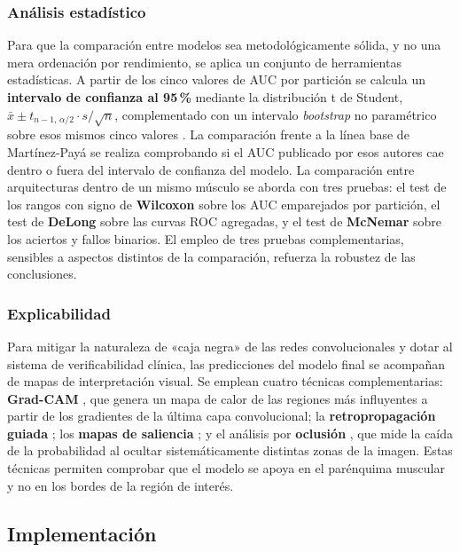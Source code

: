 \documentclass[12pt]{extarticle}
\numberwithin{equation}{section}
\begin{document}
\begin{refsection}
\subsubsection{Análisis estadístico}

Para que la comparación entre modelos sea metodológicamente sólida, y no una mera ordenación por rendimiento, se aplica un conjunto de herramientas estadísticas. A partir de los cinco valores de AUC por partición se calcula un \textbf{intervalo de confianza al 95\,\%} mediante la distribución t de Student, $\bar{x} \pm t_{n-1,\,\alpha/2}\cdot s/\sqrt{n}$, complementado con un intervalo \textit{bootstrap} no paramétrico sobre esos mismos cinco valores \cite{efron1979bootstrap}. La comparación frente a la línea base de Martínez-Payá se realiza comprobando si el AUC publicado por esos autores cae dentro o fuera del intervalo de confianza del modelo. La comparación entre arquitecturas dentro de un mismo músculo se aborda con tres pruebas: el test de los rangos con signo de \textbf{Wilcoxon} \cite{wilcoxon1945individual} sobre los AUC emparejados por partición, el test de \textbf{DeLong} \cite{delong1988comparing} sobre las curvas ROC agregadas, y el test de \textbf{McNemar} \cite{mcnemar1947note} sobre los aciertos y fallos binarios. El empleo de tres pruebas complementarias, sensibles a aspectos distintos de la comparación, refuerza la robustez de las conclusiones.

\subsubsection{Explicabilidad}

Para mitigar la naturaleza de «caja negra» de las redes convolucionales y dotar al sistema de verificabilidad clínica, las predicciones del modelo final se acompañan de mapas de interpretación visual. Se emplean cuatro técnicas complementarias: \textbf{Grad-CAM} \cite{selvaraju2017gradcam}, que genera un mapa de calor de las regiones más influyentes a partir de los gradientes de la última capa convolucional; la \textbf{retropropagación guiada} \cite{springenberg2015striving}; los \textbf{mapas de saliencia} \cite{simonyan2014deep}; y el análisis por \textbf{oclusión} \cite{zeiler2014visualizing}, que mide la caída de la probabilidad al ocultar sistemáticamente distintas zonas de la imagen. Estas técnicas permiten comprobar que el modelo se apoya en el parénquima muscular y no en los bordes de la región de interés.
\subsection{Implementación}\label{subsec:implementacion}


\end{refsection}
\end{document}
